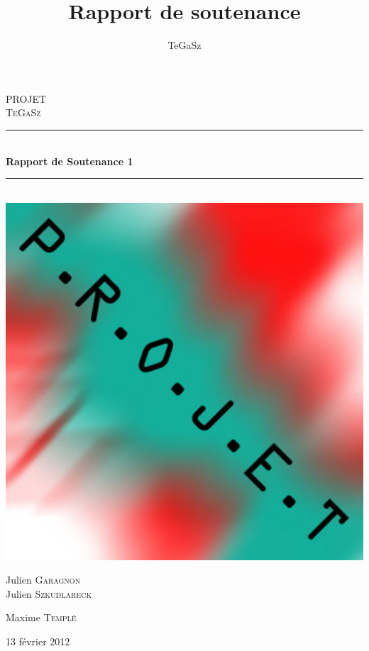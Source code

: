 \documentclass{report}
\title{Rapport de soutenance \no{1}}
\date{}
\author{TeGaSz}
\newcommand{\HRule}{\rule{\linewidth}{0.5mm}}
\begin{document}
\begin{titlepage}



\begin{center}



\textsc{\LARGE PROJET}\\[1.5cm]

\textsc{\Large TeGaSz}\\[0.5cm]


\HRule \\[0.4cm]
{ \huge \bfseries Rapport de Soutenance 1}\\[0.4cm]
  
\HRule \\[1.5cm]
\includegraphics[width=1\textwidth]{./name.jpg}\\[1cm]  
\begin{minipage}{0.4\textwidth}
\begin{flushleft} \large
Julien \textsc{Garagnon}\\
Julien \textsc{Szkudlareck}
\end{flushleft}
\end{minipage}
\begin{minipage}{0.4\textwidth}
\begin{flushright} \large
Maxime \textsc{Templé}\\

\end{flushright}
\end{minipage}

\vfill

{\large 13 février 2012}

\end{center}

\end{titlepage}
\end{document}
